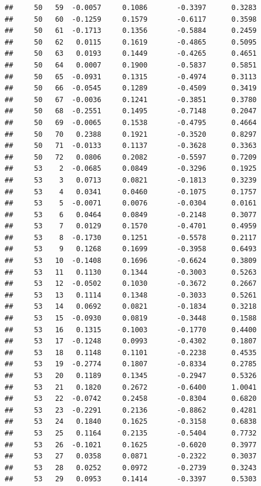 \documentclass[
]{article}
\begin{document}
\begin{verbatim}
##     50   59  -0.0057     0.1086       -0.3397      0.3283  
##     50   60  -0.1259     0.1579       -0.6117      0.3598  
##     50   61  -0.1713     0.1356       -0.5884      0.2459  
##     50   62   0.0115     0.1619       -0.4865      0.5095  
##     50   63   0.0193     0.1449       -0.4265      0.4651  
##     50   64   0.0007     0.1900       -0.5837      0.5851  
##     50   65  -0.0931     0.1315       -0.4974      0.3113  
##     50   66  -0.0545     0.1289       -0.4509      0.3419  
##     50   67  -0.0036     0.1241       -0.3851      0.3780  
##     50   68  -0.2551     0.1495       -0.7148      0.2047  
##     50   69  -0.0065     0.1538       -0.4795      0.4664  
##     50   70   0.2388     0.1921       -0.3520      0.8297  
##     50   71  -0.0133     0.1137       -0.3628      0.3363  
##     50   72   0.0806     0.2082       -0.5597      0.7209  
##     53    2  -0.0685     0.0849       -0.3296      0.1925  
##     53    3   0.0713     0.0821       -0.1813      0.3239  
##     53    4   0.0341     0.0460       -0.1075      0.1757  
##     53    5  -0.0071     0.0076       -0.0304      0.0161  
##     53    6   0.0464     0.0849       -0.2148      0.3077  
##     53    7   0.0129     0.1570       -0.4701      0.4959  
##     53    8  -0.1730     0.1251       -0.5578      0.2117  
##     53    9   0.1268     0.1699       -0.3958      0.6493  
##     53   10  -0.1408     0.1696       -0.6624      0.3809  
##     53   11   0.1130     0.1344       -0.3003      0.5263  
##     53   12  -0.0502     0.1030       -0.3672      0.2667  
##     53   13   0.1114     0.1348       -0.3033      0.5261  
##     53   14   0.0692     0.0821       -0.1834      0.3218  
##     53   15  -0.0930     0.0819       -0.3448      0.1588  
##     53   16   0.1315     0.1003       -0.1770      0.4400  
##     53   17  -0.1248     0.0993       -0.4302      0.1807  
##     53   18   0.1148     0.1101       -0.2238      0.4535  
##     53   19  -0.2774     0.1807       -0.8334      0.2785  
##     53   20   0.1189     0.1345       -0.2947      0.5326  
##     53   21   0.1820     0.2672       -0.6400      1.0041  
##     53   22  -0.0742     0.2458       -0.8304      0.6820  
##     53   23  -0.2291     0.2136       -0.8862      0.4281  
##     53   24   0.1840     0.1625       -0.3158      0.6838  
##     53   25   0.1164     0.2135       -0.5404      0.7732  
##     53   26  -0.1021     0.1625       -0.6020      0.3977  
##     53   27   0.0358     0.0871       -0.2322      0.3037  
##     53   28   0.0252     0.0972       -0.2739      0.3243  
##     53   29   0.0953     0.1414       -0.3397      0.5303  

\end{verbatim}
\end{document}
